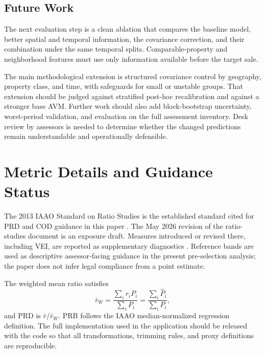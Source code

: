 \documentclass[10pt]{article}
\theoremstyle{definition}
\newcommand{\1}{\mathbf{1}}
\newcommand{\advisorchange}[1]{{\color{blue}#1}}
\newcommand{\oldtext}[1]{\textcolor{blue}{\sout{#1}}}
\begin{document}
\subsection{Future Work}

\advisorchange{The next evaluation step is a clean ablation} that compares the baseline model, better spatial and temporal information, the covariance correction, and their combination under the same temporal splits. Comparable-property and neighborhood features must use only information available before the target sale. 

The main methodological extension is structured covariance control by geography, property class, and time, with safeguards for small or unstable groups. That extension should be judged against stratified post-hoc recalibration and against a stronger base AVM. Further work should also add block-bootstrap uncertainty, worst-period validation, and evaluation on the full assessment inventory. Desk review by assessors is needed to determine whether the changed predictions remain understandable and operationally defensible.




\printbibliography


\appendix

\section{Metric Details and Guidance Status}
\label{app:metrics}

The 2013 IAAO Standard on Ratio Studies is the established standard cited for PRD and COD guidance in this paper \cite{IAAO2013Ratio}. The May 2026 revision of the ratio-studies document is an exposure draft. Measures introduced or revised there, including VEI, are reported as supplementary diagnostics \cite{IAAO2026ExposureRatio}. Reference bands are used as descriptive assessor-facing guidance in the present pre-selection analysis; the paper does not infer legal compliance from a point estimate.

The weighted mean ratio satisfies
\[
\bar r_W
=
\frac{\sum_i r_iP_i}{\sum_iP_i}
=
\frac{\sum_i\widehat P_i}{\sum_iP_i},
\]
and PRD is $\bar r/\bar r_W$. PRB follows the IAAO median-normalized regression definition. The full implementation \advisorchange{used in the application should be released} with the code so that all transformations, trimming rules, and proxy definitions are reproducible.
\end{document}
